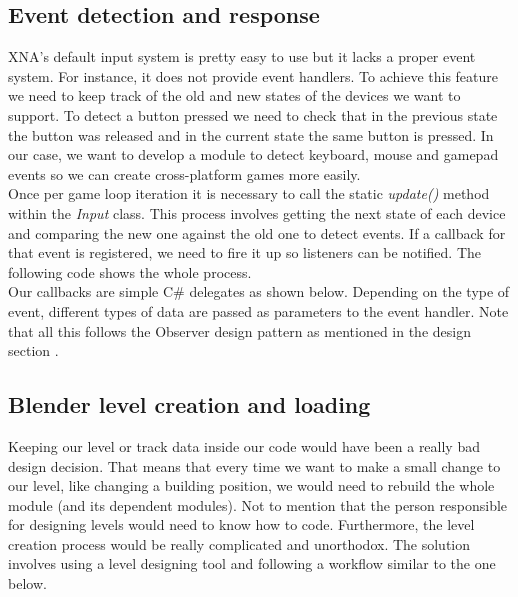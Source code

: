 

\subsection{Event detection and response}

XNA's default input system is pretty easy to use but it lacks a proper event
system. For instance, it does not provide event handlers.
To achieve this feature we need to keep track
of the old and new states of the devices we want to support. To detect a button pressed
we need to check that in the previous state the button was released and in the current
state the same button is pressed. In our case, we want to develop a module to
detect keyboard, mouse and gamepad events so we can create cross-platform games
more easily.\\

Once per game loop iteration it is necessary to call the static \textit{update()}
method within the \textit{Input} class. This process involves getting the next state of
each device and comparing the new one against the old one to detect events. If a
callback for that event is registered, we need to fire it up so listeners can be notified.
The following code shows the whole process.\\



Our callbacks are simple C\# delegates as shown below. Depending on the type of event,
different types of data are passed as parameters to the event handler. Note that all
this follows the Observer design pattern as mentioned in the design section \cite{gamm94}.\\



\subsection{Blender level creation and loading}

Keeping our level or track data inside our code would have been a really bad design decision.
That means that every time we want to make a small change to our level, like changing
a building position, we would need to rebuild the whole module (and its dependent modules).
Not to mention that the person responsible for designing levels would need to know how to code.
Furthermore, the level creation process would be really complicated and unorthodox. The solution
involves using a level designing tool and following a workflow similar to the one below.

